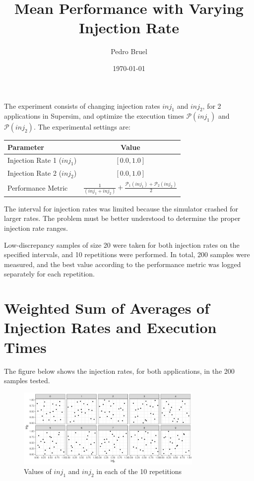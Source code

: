 \documentclass[a4paper]{article}
\author{Pedro Bruel}
\date{\today}
\title{Mean Performance with Varying Injection Rate}
\begin{document}
\maketitle
The experiment  consists of changing  injection rates  \(inj_1\) and \(inj_2\),  for 2
applications in  Supersim, and optimize the  execution times \(\mathcal{P}(inj_1)\)
and \(\mathcal{P}(inj_2)\).  The experimental settings are:

\begin{center}
\begin{tabular}{lc}
\toprule
Parameter & Value\\
\midrule
Injection Rate 1 (\(inj_1\)) & \([0.0, 1.0]\)\\
Injection Rate 2 (\(inj_2\)) & \([0.0, 1.0]\)\\
Performance Metric & \(\frac{1}{(inj_1 + inj_2)} + \frac{\mathcal{P}_1(inj_1) + \mathcal{P}_2(inj_2)}{2}\)\\
\bottomrule
\end{tabular}
\end{center}

The interval for  injection rates was limited because the  simulator crashed for
larger rates.   The problem must  be better  understood to determine  the proper
injection rate ranges.

Low-discrepancy samples  of size 20 were  taken for both injection  rates on the
specified intervals,  and 10 repetitions  were performed. In total,  200 samples
were measured, and the best value according to the performance metric was logged
separately for each repetition.

\section{Weighted Sum of Averages of Injection Rates and Execution Times}
\label{sec:org7357af7}
The figure  below shows the injection  rates, for both applications,  in the 200
samples tested.

\begin{figure}[htbp]
\centering
\includegraphics[width=0.8\textwidth]{./img/2_apps_min_mean_time/rs_20_samples_10_iterations_weighted_full_scatter.pdf}
\caption{Values of \(inj_1\) and \(inj_2\) in each of the 10 repetitions}
\end{figure}
\end{document}
